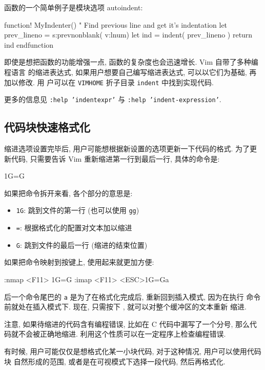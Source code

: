 函数的一个简单例子是模块选项 autoindent:
\begin{vimcode}
function! MyIndenter()
   " Find previous line and get it's indentation
   let prev_lineno = s:prevnonblank( v:lnum)
   let ind = indent( prev_lineno )
   return ind
endfunction
\end{vimcode}

即使是想把函数的功能增强一点, 函数的复杂度也会迅速增长. Vim 自带了多种编程语言
的缩进表达式, 如果用户想要自己编写缩进表达式, 可以以它们为基础, 再加以修改. 用
户可以在 \texttt{VIMHOME} 折子目录 \texttt{indent} 中找到实现代码.

更多的信息见 \texttt{:help 'indentexpr'} 与 \texttt{:help 'indent-expression'}.

\subsection{代码块快速格式化}
\label{subsec:fast_code_block_formatting}

缩进选项设置完毕后, 用户可能想根据新设置的选项更新一下代码的格式. 为了更新代码,
只需要告诉 Vim 重新缩进第一行到最后一行, 具体的命令是:
\begin{vimcode}
1G=G
\end{vimcode}
如果把命令拆开来看, 各个部分的意思是:
\begin{itemize}
    \item \texttt{1G}: 跳到文件的第一行 (也可以使用 \texttt{gg})
    \item \texttt{=}: 根据格式化的配置对文本加以缩进
    \item \texttt{G}: 跳到文件的最后一行 (缩进的结束位置)
\end{itemize}

如果把命令映射到按键上, 使用起来就更加方便:
\begin{vimcode}
:nmap <F11> 1G=G
:imap <F11> <ESC>1G=Ga
\end{vimcode}
后一个命令尾巴的 \texttt{a} 是为了在格式化完成后, 重新回到插入模式, 因为在执行
命令前就处在插入模式下. 现在, 只需按下 , 就可以对整个缓冲区的文本重新
缩进.

\begin{warning}
    注意, 如果待缩进的代码含有编程错误, 比如在 C 代码中漏写了一个分号, 那么代
    码就不会被正确地缩进. 利用这个性质可以在一定程序上检查编程错误.
\end{warning}

有时候, 用户可能仅仅是想格式化某一小块代码, 对于这种情况, 用户可以使用代码块
自然形成的范围, 或者是在可视模式下选择一段代码, 然后再格式化.


